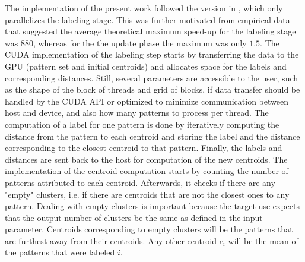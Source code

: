 The implementation of the present work followed the version in \cite{Zechner2009b}, which only parallelizes the labeling stage. %
This was further motivated from empirical data that suggested the average theoretical maximum speed-up for the labeling stage was $880$, whereas for the the update phase the maximum was only $1.5$.
The CUDA implementation of the labeling step starts by transferring the data to the GPU (pattern set and initial centroids) and allocates space for the labels and corresponding distances.
Still, several parameters are accessible to the user, such as the shape of the block of threads and grid of blocks, if data transfer should be handled by the CUDA API or optimized to minimize communication between host and device, and also how many patterns to process per thread.
The computation of a label for one pattern is done by iteratively computing the distance from the pattern to each centroid and storing the label and the distance corresponding to the closest centroid to that pattern.
Finally, the labels and distances are sent back to the host for computation of the new centroids.
The implementation of the centroid computation starts by counting the number of patterns attributed to each centroid.
Afterwards, it checks if there are any "empty" clusters, i.e. if there are centroids that are not the closest ones to any pattern.
Dealing with empty clusters is important because the target use expects that the output number of clusters be the same as defined in the input parameter.
Centroids corresponding to empty clusters will be the patterns that are furthest away from their centroids.
Any other centroid $c_i$ will be the mean of the patterns that were labeled $i$.